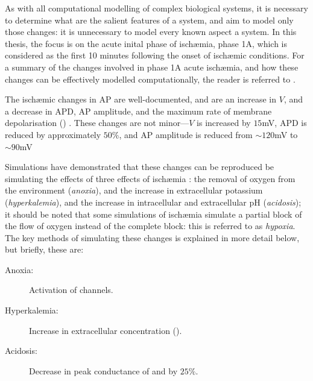 \documentclass[../thesis-main.tex]{subfiles}
\begin{document}
 As with all computational modelling of complex biological systems, it is necessary to determine what are the salient features of a system, and aim to model only those changes: it is unnecessary to model every known aspect a system.  In this thesis, the focus is on the acute inital phase of isch\ae mia, phase 1A, which is considered as the first 10 minutes following the onset of isch\ae mic conditions. For a summary of the changes involved in phase 1A acute isch\ae mia, and how these changes can be effectively modelled computationally, the reader is referred to \citep{Rodriguez2006}.
 
 The isch\ae mic changes in AP are well-documented, and are an increase in $V$, and a decrease in APD, AP amplitude, and the maximum rate of membrane depolarisation (\dvdt{}) \citep{Carmeliet1999, Weiss1982, Weiss1992, Kleber1987a}. These changes are not minor---$V$ is increased by $15$mV, APD is reduced by approximately $50\%$, and AP amplitude is reduced from $\sim120$mV to $\sim90$mV \citep{Rodriguez2002}
 
 Simulations have demonstrated that these changes can be reproduced be simulating the effects of three effects of isch\ae mia \citep{Shaw1997, Shaw1997a, Ferrero1996}: the removal of oxygen from the environment (\emph{anoxia}), and the increase in extracellular potassium (\emph{hyperkalemia}), and the increase in intracellular and extracellular pH (\emph{acidosis}); it should be noted that some simulations of isch\ae mia simulate a partial block of the flow of oxygen instead of the complete block: this is referred to as \emph{hypoxia}. The key methods of simulating these changes is explained in more detail below, but briefly, these are:
 \begin{description}
  \item[Anoxia:] Activation of \ikatp{} channels.
  \item[Hyperkalemia:] Increase in extracellular \K{} concentration (\ko{}).
  \item[Acidosis:] Decrease in peak conductance of \ina{} and \ica{} by $25\%$.
 \end{description}
 
\end{document}
